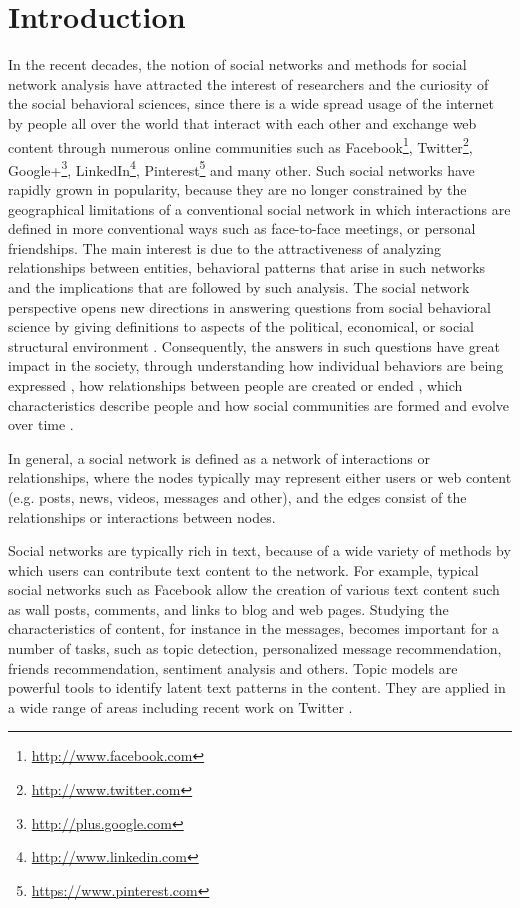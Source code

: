 \section{Introduction}


In the recent decades, the notion of social networks and methods for social network analysis have attracted the interest of researchers and the curiosity of the social behavioral sciences, since there is a wide spread usage of the internet by people all over the world that interact with each other and exchange web content through numerous online communities such as Facebook\footnote{\url{http://www.facebook.com}}, Twitter\footnote{\url{http://www.twitter.com}}, Google+\footnote{\url{http://plus.google.com}}, LinkedIn\footnote{\url{http://www.linkedin.com}}, Pinterest\footnote{\url{https://www.pinterest.com}} and many other. Such social networks have rapidly grown
in popularity, because they are no longer constrained by the geographical limitations of a conventional social network in which interactions are defined in more conventional ways such as face-to-face meetings, or personal friendships. The main interest is due to the attractiveness of analyzing relationships between entities, behavioral patterns that arise in such networks and the implications that are followed by such analysis. The social network perspective opens new directions in answering questions from social behavioral science by giving definitions to aspects of the political, economical, or social structural environment \cite{sna}. Consequently, the answers in such questions have great impact in the society, through understanding how individual behaviors are being expressed \cite{ba}, how relationships between people are created or ended \cite{friend_pred}, which characteristics describe people \cite{am2} and how social communities are formed \cite{com_det} and evolve over time \cite{com_ev1}. 


In general, a social network is defined as a network of interactions or relationships, where the nodes typically may represent either users or web content (e.g. posts, news, videos, messages and other), and the edges consist of the relationships or interactions between nodes. %
 

Social networks are typically rich in text, because of a wide variety of methods by which users can contribute text content to the network. For example,
typical social networks such as Facebook allow the creation of various text content such as wall posts, comments, and links to blog and web pages. Studying the characteristics of content, for instance in the messages, becomes important for a number of tasks, such as topic detection, personalized message recommendation, friends recommendation, sentiment analysis and others. Topic models \cite{blei2} are powerful tools to identify latent text patterns in the content. They are applied in a wide range of areas including recent work on Twitter \cite{microblogs}.

